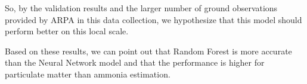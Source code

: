 So, by the validation results and the larger number of ground observations provided by ARPA in this data collection, we hypothesize that this model should perform better on this local scale.
\par
Based on these results, we can point out that Random Forest is more accurate than the  Neural Network model and that the performance is higher for particulate matter than ammonia estimation.\\

